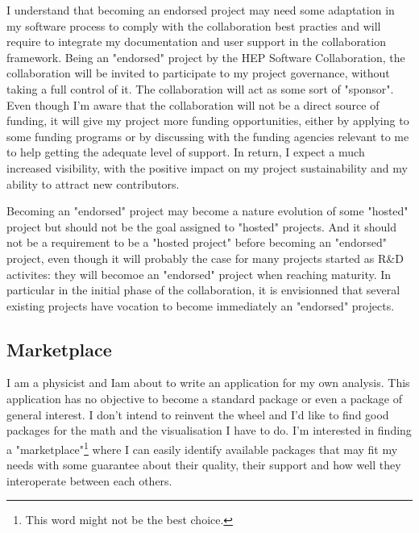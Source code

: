 \documentclass[11pt]{article} %
\begin{document}
I understand that becoming an endorsed project may need some adaptation in my software process to comply with the collaboration best practies and will require
to integrate my documentation and user support in the collaboration framework. Being an "endorsed" project by the HEP Software Collaboration, the collaboration
will be invited to participate to my project governance, without taking a full control of it. The collaboration will act as some sort of "sponsor". Even though I'm aware
that the collaboration will not be a direct source of funding, it will give my project more funding opportunities, either by applying to some funding programs or 
by discussing with the funding
agencies relevant to me to help getting the adequate level of support. In return, I expect a much increased visibility, with the positive impact
on my project sustainability and my ability to attract new contributors.

Becoming an "endorsed" project may become a nature evolution of some "hosted" project but should not be the goal assigned to "hosted" projects. And
it should not be a requirement to be a "hosted project" before becoming an "endorsed" project, even though it will probably the case for many projects
started as R\&D activites: they will becomoe an "endorsed" project when reaching maturity. In particular in the initial phase of the collaboration,
it is envisionned that several existing projects have vocation to become immediately an "endorsed" projects.

\subsection{Marketplace}

I am a physicist and Iam about to write an application for my own analysis. This application has no objective to become a standard
package or even a package of general interest. I don't intend to reinvent the wheel and I'd like to find good
packages for the math and the visualisation I have to do. I'm interested in finding a "marketplace"\footnote{This word might not be the best choice.}
where I can easily identify available packages that may fit my needs with some guarantee about their quality,
their support and how well they interoperate between each others.
\end{document}
